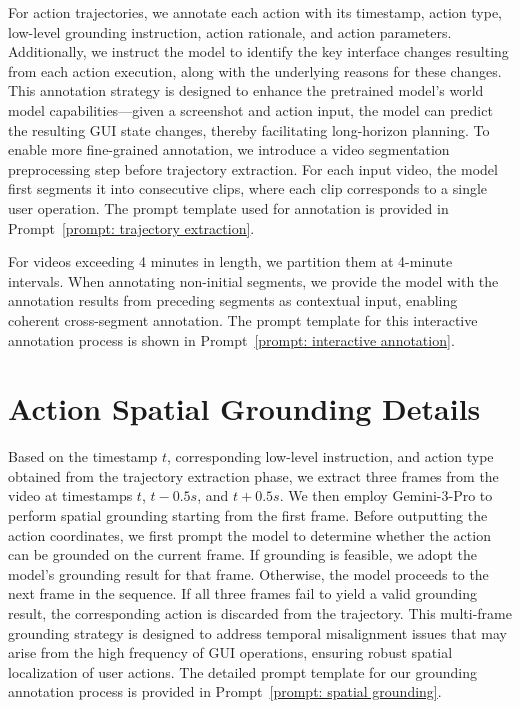 \documentclass{llmxive}
\begin{document}
For action trajectories, we annotate each action with its timestamp, action type, low-level grounding instruction, action rationale, and action parameters. Additionally, we instruct the model to identify the key interface changes resulting from each action execution, along with the underlying reasons for these changes. This annotation strategy is designed to enhance the pretrained model's world model capabilities—given a screenshot and action input, the model can predict the resulting GUI state changes, thereby facilitating long-horizon planning. To enable more fine-grained annotation, we introduce a video segmentation preprocessing step before trajectory extraction. For each input video, the model first segments it into consecutive clips, where each clip corresponds to a single user operation. The prompt template used for annotation is provided in Prompt~\ref{prompt: trajectory extraction}.

For videos exceeding 4 minutes in length, we partition them at 4-minute intervals. When annotating non-initial segments, we provide the model with the annotation results from preceding segments as contextual input, enabling coherent cross-segment annotation. The prompt template for this interactive annotation process is shown in Prompt~\ref{prompt: interactive annotation}.

\section{Action Spatial Grounding Details}
\label{sec: action grounding}
Based on the timestamp $t$, corresponding low-level instruction, and action type obtained from the trajectory extraction phase, we extract three frames from the video at timestamps $t$, $t-0.5s$, and $t+0.5s$. We then employ Gemini-3-Pro to perform spatial grounding starting from the first frame.
Before outputting the action coordinates, we first prompt the model to determine whether the action can be grounded on the current frame. If grounding is feasible, we adopt the model's grounding result for that frame. Otherwise, the model proceeds to the next frame in the sequence. If all three frames fail to yield a valid grounding result, the corresponding action is discarded from the trajectory.
This multi-frame grounding strategy is designed to address temporal misalignment issues that may arise from the high frequency of GUI operations, ensuring robust spatial localization of user actions. The detailed prompt template for our grounding annotation process is provided in Prompt~\ref{prompt: spatial grounding}.
\end{document}
